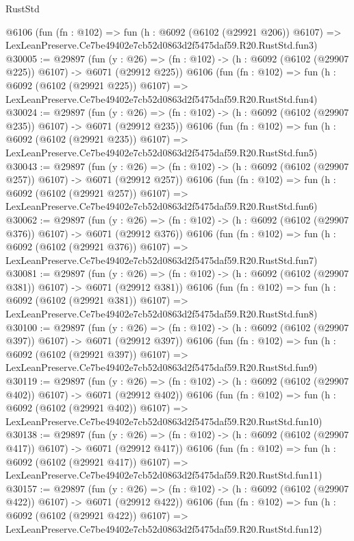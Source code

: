 \begin{lexlean}{RustStd}
\begin{coremodule}
    @6106
    (fun (fn : @102) =>
    fun (h : @6092 (@6102 (@29921 @206)) @6107) =>
    LexLeanPreserve.Ce7be49402e7cb52d0863d2f5475daf59.R20.RustStd.fun3)
@30005 := @29897
    (fun (y : @26) => (fn : @102) -> (h : @6092 (@6102 (@29907 @225)) @6107) -> @6071 (@29912 @225))
    @6106
    (fun (fn : @102) =>
    fun (h : @6092 (@6102 (@29921 @225)) @6107) =>
    LexLeanPreserve.Ce7be49402e7cb52d0863d2f5475daf59.R20.RustStd.fun4)
@30024 := @29897
    (fun (y : @26) => (fn : @102) -> (h : @6092 (@6102 (@29907 @235)) @6107) -> @6071 (@29912 @235))
    @6106
    (fun (fn : @102) =>
    fun (h : @6092 (@6102 (@29921 @235)) @6107) =>
    LexLeanPreserve.Ce7be49402e7cb52d0863d2f5475daf59.R20.RustStd.fun5)
@30043 := @29897
    (fun (y : @26) => (fn : @102) -> (h : @6092 (@6102 (@29907 @257)) @6107) -> @6071 (@29912 @257))
    @6106
    (fun (fn : @102) =>
    fun (h : @6092 (@6102 (@29921 @257)) @6107) =>
    LexLeanPreserve.Ce7be49402e7cb52d0863d2f5475daf59.R20.RustStd.fun6)
@30062 := @29897
    (fun (y : @26) => (fn : @102) -> (h : @6092 (@6102 (@29907 @376)) @6107) -> @6071 (@29912 @376))
    @6106
    (fun (fn : @102) =>
    fun (h : @6092 (@6102 (@29921 @376)) @6107) =>
    LexLeanPreserve.Ce7be49402e7cb52d0863d2f5475daf59.R20.RustStd.fun7)
@30081 := @29897
    (fun (y : @26) => (fn : @102) -> (h : @6092 (@6102 (@29907 @381)) @6107) -> @6071 (@29912 @381))
    @6106
    (fun (fn : @102) =>
    fun (h : @6092 (@6102 (@29921 @381)) @6107) =>
    LexLeanPreserve.Ce7be49402e7cb52d0863d2f5475daf59.R20.RustStd.fun8)
@30100 := @29897
    (fun (y : @26) => (fn : @102) -> (h : @6092 (@6102 (@29907 @397)) @6107) -> @6071 (@29912 @397))
    @6106
    (fun (fn : @102) =>
    fun (h : @6092 (@6102 (@29921 @397)) @6107) =>
    LexLeanPreserve.Ce7be49402e7cb52d0863d2f5475daf59.R20.RustStd.fun9)
@30119 := @29897
    (fun (y : @26) => (fn : @102) -> (h : @6092 (@6102 (@29907 @402)) @6107) -> @6071 (@29912 @402))
    @6106
    (fun (fn : @102) =>
    fun (h : @6092 (@6102 (@29921 @402)) @6107) =>
    LexLeanPreserve.Ce7be49402e7cb52d0863d2f5475daf59.R20.RustStd.fun10)
@30138 := @29897
    (fun (y : @26) => (fn : @102) -> (h : @6092 (@6102 (@29907 @417)) @6107) -> @6071 (@29912 @417))
    @6106
    (fun (fn : @102) =>
    fun (h : @6092 (@6102 (@29921 @417)) @6107) =>
    LexLeanPreserve.Ce7be49402e7cb52d0863d2f5475daf59.R20.RustStd.fun11)
@30157 := @29897
    (fun (y : @26) => (fn : @102) -> (h : @6092 (@6102 (@29907 @422)) @6107) -> @6071 (@29912 @422))
    @6106
    (fun (fn : @102) =>
    fun (h : @6092 (@6102 (@29921 @422)) @6107) =>
    LexLeanPreserve.Ce7be49402e7cb52d0863d2f5475daf59.R20.RustStd.fun12)

\end{coremodule}
\end{lexlean}
